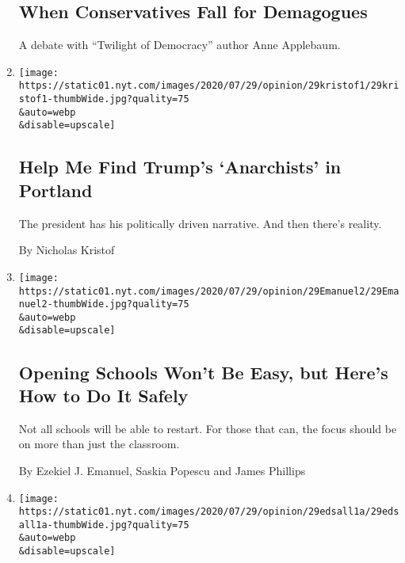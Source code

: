 \begin{enumerate}
  \hypertarget{when-conservatives-fall-for-demagogues}{%
  \subsection{When Conservatives Fall for
  Demagogues}\label{when-conservatives-fall-for-demagogues}}

  A debate with ``Twilight of Democracy'' author Anne Applebaum.
\item
  \href{/2020/07/29/opinion/portland-protests-trump.html}{}

  \texttt{[image: https://static01.nyt.com/images/2020/07/29/opinion/29kristof1/29kristof1-thumbWide.jpg?quality=75\\\&auto=webp\\\&disable=upscale]}

  \hypertarget{help-me-find-trumps-anarchists-in-portland}{%
  \subsection{Help Me Find Trump's `Anarchists' in
  Portland}\label{help-me-find-trumps-anarchists-in-portland}}

  The president has his politically driven narrative. And then there's
  reality.

  By Nicholas Kristof
\item
  \href{/2020/07/29/opinion/coronavirus-schools-reopen.html}{}

  \texttt{[image: https://static01.nyt.com/images/2020/07/29/opinion/29Emanuel2/29Emanuel2-thumbWide.jpg?quality=75\\\&auto=webp\\\&disable=upscale]}

  \hypertarget{opening-schools-wont-be-easy-but-heres-how-to-do-it-safely}{%
  \subsection{Opening Schools Won't Be Easy, but Here's How to Do It
  Safely}\label{opening-schools-wont-be-easy-but-heres-how-to-do-it-safely}}

  Not all schools will be able to restart. For those that can, the focus
  should be on more than just the classroom.

  By Ezekiel J. Emanuel, Saskia Popescu and James Phillips
\item
  \href{/2020/07/29/opinion/trump-2020-populism.html}{}

  \texttt{[image: https://static01.nyt.com/images/2020/07/29/opinion/29edsall1a/29edsall1a-thumbWide.jpg?quality=75\\\&auto=webp\\\&disable=upscale]}

  \hypertarget{trump-is-trying-to-bend-reality-to-his-will}{%
}
\end{enumerate}
